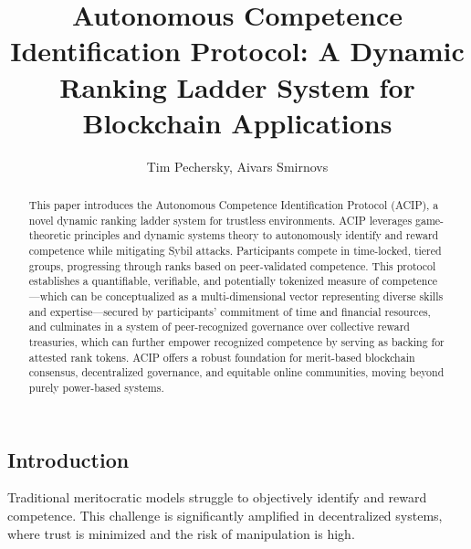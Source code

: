 \documentclass{article}
\title{Autonomous Competence Identification Protocol: A Dynamic Ranking Ladder System for Blockchain Applications}
\author{Tim Pechersky, Aivars Smirnovs}
\begin{document}
\begin{CJK}{UTF8}{gbsn}

    \maketitle

    \begin{abstract}
        This paper introduces the Autonomous Competence Identification Protocol (ACIP), a novel dynamic ranking ladder system for trustless environments. ACIP leverages game-theoretic principles and dynamic systems theory to autonomously identify and reward competence while mitigating Sybil attacks. Participants compete in time-locked, tiered groups, progressing through ranks based on peer-validated competence. This protocol establishes a quantifiable, verifiable, and potentially tokenized measure of competence—which can be conceptualized as a multi-dimensional vector representing diverse skills and expertise—secured by participants' commitment of time and financial resources, and culminates in a system of peer-recognized governance over collective reward treasuries, which can further empower recognized competence by serving as backing for attested rank tokens. ACIP offers a robust foundation for merit-based blockchain consensus, decentralized governance, and equitable online communities, moving beyond purely power-based systems.
    \end{abstract}

    \section{Introduction}

    Traditional meritocratic models struggle to objectively identify and reward competence.\cite{Arrow2000} This challenge is significantly amplified in decentralized systems, where trust is minimized and the risk of manipulation is high.  \cite{Rainer2023}\cite{Robin22}\cite{Xuan2024}


\end{CJK}
\end{document}
